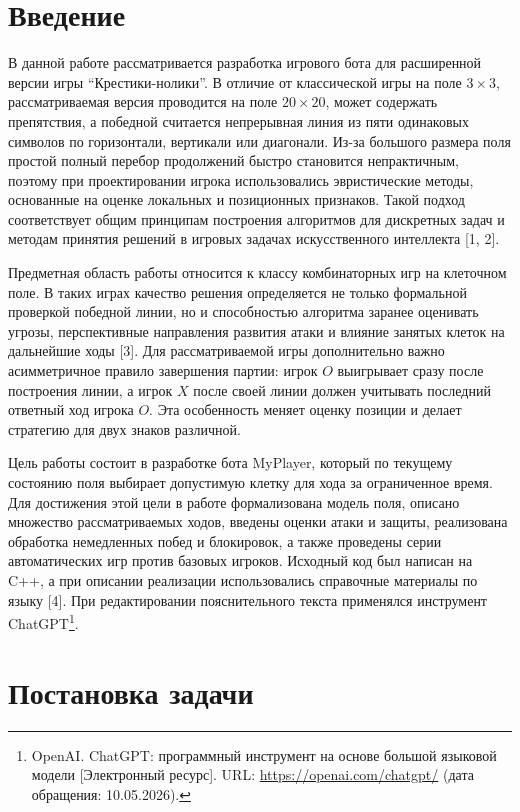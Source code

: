 \documentclass[a4paper,14pt]{extarticle}
\begin{document}
\setcounter{page}{2}
\tableofcontents

\clearpage
\section*{Введение}

В данной работе рассматривается разработка игрового бота для расширенной версии игры “Крестики-нолики”. В отличие от классической игры на поле $3 \times 3$, рассматриваемая версия проводится на поле $20 \times 20$, может содержать препятствия, а победной считается непрерывная линия из пяти одинаковых символов по горизонтали, вертикали или диагонали. Из-за большого размера поля простой полный перебор продолжений быстро становится непрактичным, поэтому при проектировании игрока использовались эвристические методы, основанные на оценке локальных и позиционных признаков. Такой подход соответствует общим принципам построения алгоритмов для дискретных задач и методам принятия решений в игровых задачах искусственного интеллекта [1, 2].

Предметная область работы относится к классу комбинаторных игр на клеточном поле. В таких играх качество решения определяется не только формальной проверкой победной линии, но и способностью алгоритма заранее оценивать угрозы, перспективные направления развития атаки и влияние занятых клеток на дальнейшие ходы [3]. Для рассматриваемой игры дополнительно важно асимметричное правило завершения партии: игрок $O$ выигрывает сразу после построения линии, а игрок $X$ после своей линии должен учитывать последний ответный ход игрока $O$. Эта особенность меняет оценку позиции и делает стратегию для двух знаков различной.

Цель работы состоит в разработке бота MyPlayer, который по текущему состоянию поля выбирает допустимую клетку для хода за ограниченное время. Для достижения этой цели в работе формализована модель поля, описано множество рассматриваемых ходов, введены оценки атаки и защиты, реализована обработка немедленных побед и блокировок, а также проведены серии автоматических игр против базовых игроков. Исходный код был написан на C++, а при описании реализации использовались справочные материалы по языку [4]. При редактировании пояснительного текста применялся инструмент ChatGPT\footnote{OpenAI. ChatGPT: программный инструмент на основе большой языковой модели [Электронный ресурс]. URL: \url{https://openai.com/chatgpt/} (дата обращения: 10.05.2026).}.

\clearpage
\section{Постановка задачи}
\end{document}
